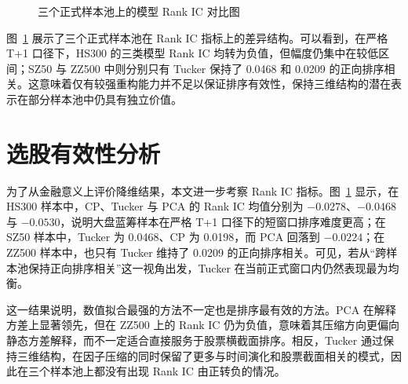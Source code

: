 \begin{figure}[!t]
\centering
{}
\caption{三个正式样本池上的模型 Rank IC 对比图}
\label{fig:rankic}
\end{figure}

图~\ref{fig:rankic} 展示了三个正式样本池在 Rank IC 指标上的差异结构。可以看到，在严格 T+1 口径下，HS300 的三类模型 Rank IC 均转为负值，但幅度仍集中在较低区间；SZ50 与 ZZ500 中则分别只有 Tucker 保持了 0.0468 和 0.0209 的正向排序相关。这意味着仅有较强重构能力并不足以保证排序有效性，保持三维结构的潜在表示在部分样本池中仍具有独立价值。

\section{选股有效性分析}

为了从金融意义上评价降维结果，本文进一步考察 Rank IC 指标。图~\ref{fig:rankic} 显示，在 HS300 样本中，CP、Tucker 与 PCA 的 Rank IC 均值分别为 $-0.0278$、$-0.0468$ 与 $-0.0530$，说明大盘蓝筹样本在严格 T+1 口径下的短窗口排序难度更高；在 SZ50 样本中，Tucker 为 0.0468、CP 为 0.0198，而 PCA 回落到 $-0.0224$；在 ZZ500 样本中，也只有 Tucker 维持了 0.0209 的正向排序相关。可见，若从“跨样本池保持正向排序相关”这一视角出发，Tucker 在当前正式窗口内仍然表现最为均衡。

这一结果说明，数值拟合最强的方法不一定也是排序最有效的方法。PCA 在解释方差上显著领先，但在 ZZ500 上的 Rank IC 仍为负值，意味着其压缩方向更偏向静态方差解释，而不一定适合直接服务于股票横截面排序。相反，Tucker 通过保持三维结构，在因子压缩的同时保留了更多与时间演化和股票截面相关的模式，因此在三个样本池上都没有出现 Rank IC 由正转负的情况。

